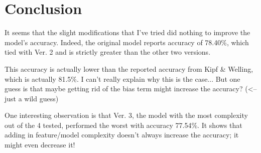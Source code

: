 \chapter{Conclusion}

It seems that the slight modifications that I've tried did nothing to improve the model's accuracy. Indeed, the original model reports accuracy of 78.40\%, which tied with Ver. 2 and is strictly greater than the other two versions.

This accuracy is actually lower than the reported accuracy from Kipf \& Welling, which is actually 81.5\%.
I can't really explain why this is the case... But one guess is that maybe getting rid of the bias term might increase the accuracy? (<-- just a wild guess)

One interesting observation is that Ver. 3, the model with the most complexity out of the 4 tested, performed the worst with accuracy 77.54\%. It shows that adding in feature/model complexity doesn't always increase the accuracy; it might even decrease it!
